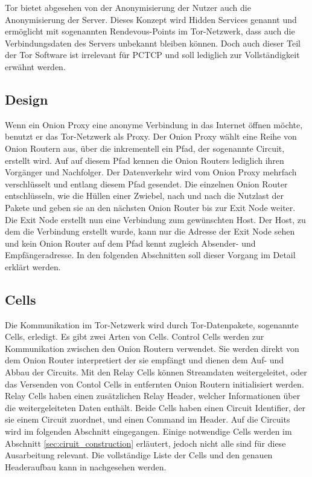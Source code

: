 \documentclass[fleqn,envcountsame,runningheads,10pt,a4paper]{llncs}
\begin{document}
Tor bietet abgesehen von der Anonymisierung der Nutzer auch die Anonymisierung 
der Server. Dieses Konzept wird Hidden Services genannt und ermöglicht mit 
sogenannten Rendevous-Points im Tor-Netzwerk, dass auch die 
Verbindungsdaten des Servers unbekannt bleiben können. Doch auch dieser Teil der 
Tor Software ist irrelevant für PCTCP und soll lediglich zur Vollständigkeit 
erwähnt werden.

\subsection{Design}

Wenn ein Onion Proxy eine anonyme Verbindung in das Internet öffnen möchte, 
benutzt er das Tor-Netzwerk als Proxy. Der Onion Proxy wählt eine Reihe 
von Onion Routern aus, über die inkrementell ein Pfad, der sogenannte Circuit, 
erstellt wird. Auf auf diesem Pfad kennen die Onion Routers lediglich ihren 
Vorgänger und Nachfolger. Der Datenverkehr wird vom Onion Proxy mehrfach 
verschlüsselt und entlang diesem Pfad gesendet. Die einzelnen Onion Router 
entschlüsseln, wie die Hüllen einer Zwiebel, nach und nach die Nutzlast der 
Pakete und geben sie an den nächsten Onion Router bis zur Exit Node weiter. Die 
Exit Node erstellt nun eine Verbindung zum gewünschten Host. Der Host, zu dem 
die Verbindung erstellt wurde, kann nur die Adresse der Exit Node sehen und kein 
Onion Router auf dem Pfad kennt zugleich Absender- und Empfängeradresse. In den 
folgenden Abschnitten soll dieser Vorgang im Detail erklärt werden.

\subsection{Cells}

Die Kommunikation im Tor-Netzwerk wird durch Tor-Datenpakete, sogenannte Cells, 
erledigt. Es gibt zwei Arten von Cells. Control Cells werden zur Kommunikation 
zwischen den Onion Routern verwendet. Sie werden direkt von dem Onion Router 
interpretiert der sie empfängt und dienen dem Auf- und Abbau der Circuits. Mit 
den Relay Cells können Streamdaten weitergeleitet, oder das Versenden von Contol 
Cells in entfernten Onion Routern initialisiert werden. Relay Cells haben einen 
zusätzlichen Relay Header, welcher Informationen über die weitergeleiteten Daten 
enthält. Beide Cells haben einen Circuit Identifier, der sie einem Circuit 
zuordnet, und einen Command im Header. Auf die Circuits wird im folgenden 
Abschnitt eingegangen. Einige notwendige Cells werden im Abschnitt 
\ref{sec:ciruit_construction} erläutert, jedoch nicht alle sind für diese 
Ausarbeitung relevant. Die vollständige Liste der Cells und den genauen 
Headeraufbau kann in \cite{tor} nachgesehen werden.
\end{document}
